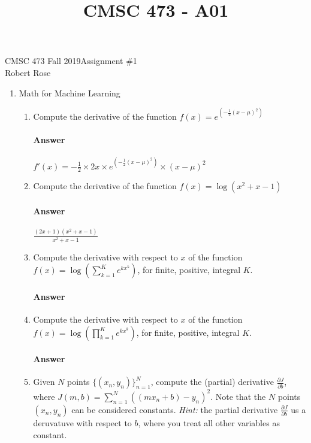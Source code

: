 \documentclass[12pt]{article}
\title{CMSC 473 - A01}
\begin{document}
CMSC 473 Fall 2019\hfill Assignment \#1\\
Robert Rose

\hrulefill

\begin{enumerate}
\item Math for Machine Learning
  \begin{enumerate}
  \item Compute the derivative of the function $f(x) = e^{(-\frac{1}{2}(x - \mu)^2)}$\\
  \vspace{-2.5em}
  \paragraph{Answer}  $f'(x) = - \frac{1}{2} \times 2x \times e^{(-\frac{1}{2}(x - \mu)^2)} \times (x - \mu)^2$

  \item Compute the derivative of the function $f(x) = \log(x^2 + x - 1)$\\
  \vspace{-2.5em}
  \paragraph{Answer} $\frac{(2x + 1)(x^2 + x - 1)}{x^2 + x - 1}$

  \item Compute the derivative with respect to $x$ of the function 
        $f(x) = \log(\sum_{k=1}^{K}e^{kx^k})$, for finite, positive, integral $K$.\\
  \vspace{-2.5em}
  \paragraph{Answer} 

  \item Compute the derivative with respect to $x$ of the function
        $f(x) = \log(\prod_{k=1}^{K}e^{kx^k})$, for finite, positive, integral $K$.\\
  \vspace{-2.5em}
  \paragraph{Answer} 

  \item Given $N$ points $\{(x_n,y_n)\}_{n=1}^{N}$, compute the (partial) derivative
        $\frac{\partial J}{\partial b}$, where $J(m,b) = \sum_{n=1}^{N}( ( mx_n + b ) - y_n )^2$. 
        Note that the $N$ points $(x_n, y_n)$ can be considered constants. \textit{Hint:} the
        partial derivative $\frac{\partial J}{\partial b}$ us a deruvatuve with respect to $b$,
        where you treat all other variables as constant.\\
  \vspace{-2.5em}

\end{enumerate}
\end{enumerate}
\end{document}
